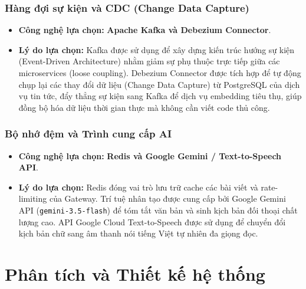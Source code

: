 \documentclass[12pt,a4paper]{report}
\begin{document}
\subsection{Hàng đợi sự kiện và CDC (Change Data Capture)}
\begin{itemize}
    \item \textbf{Công nghệ lựa chọn:} \textbf{Apache Kafka và Debezium Connector}.
    \item \textbf{Lý do lựa chọn:} Kafka được sử dụng để xây dựng kiến trúc hướng sự kiện (Event-Driven Architecture) nhằm giảm sự phụ thuộc trực tiếp giữa các microservices (loose coupling). Debezium Connector được tích hợp để tự động chụp lại các thay đổi dữ liệu (Change Data Capture) từ PostgreSQL của dịch vụ tin tức, đẩy thẳng sự kiện sang Kafka để dịch vụ embedding tiêu thụ, giúp đồng bộ hóa dữ liệu thời gian thực mà không cần viết code thủ công.
\end{itemize}

\subsection{Bộ nhớ đệm và Trình cung cấp AI}
\begin{itemize}
    \item \textbf{Công nghệ lựa chọn:} \textbf{Redis và Google Gemini / Text-to-Speech API}.
    \item \textbf{Lý do lựa chọn:} Redis đóng vai trò lưu trữ cache các bài viết và rate-limiting của Gateway. Trí tuệ nhân tạo được cung cấp bởi Google Gemini API (\texttt{gemini-3.5-}\allowbreak\texttt{flash}) để tóm tắt văn bản và sinh kịch bản đối thoại chất lượng cao. API Google Cloud Text-to-Speech được sử dụng để chuyển đổi kịch bản chữ sang âm thanh nói tiếng Việt tự nhiên đa giọng đọc.
\end{itemize}

\chapter{Phân tích và Thiết kế hệ thống}
\end{document}
